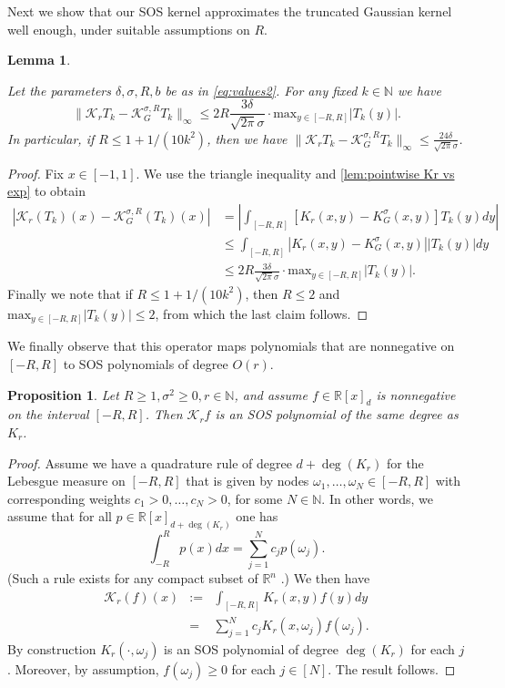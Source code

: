 \documentclass[11pt]{article}
\newcommand{\N}{\mathbb{N}}
\newcommand{\R}{\mathbb{R}}
\renewcommand{\max}{\mathrm{max}}
\newtheorem{proposition}[defin]{Proposition}
\newtheorem{lemma}[defin]{Lemma}
\theoremstyle{definition}
\newcommand{\const}[1]{1/(10 #1^2)}
\begin{document}
Next we show that our SOS kernel approximates the truncated Gaussian kernel well enough, under suitable assumptions on $R$.

\begin{lemma}
\label{lemma:truncation_error}

Let the parameters $\delta,\sigma, R, b$ be as in \cref{eq:values2}. For any fixed $k \in \N$ we have
\[
\|\mathcal K_r T_k - \mathcal K_G^{\sigma,R} T_k \|_\infty \leq 2R\frac{3\delta}{\sqrt{2\pi}\sigma} \cdot \max_{y \in [-R,R]} |T_k(y)|.
\]
In particular, if $R \leq 1 + \const{k}$, then we have $\|\mathcal K_r T_k - \mathcal K_G^{\sigma,R} T_k \|_\infty \leq \frac{24\delta}{\sqrt{2\pi}\sigma}$.
\end{lemma}
\begin{proof}

Fix $x \in [-1,1]$. We use the triangle inequality and \cref{lem:pointwise Kr vs exp} to obtain
\begin{align*}
|\mathcal K_r (T_k)(x) - \mathcal K_G^{\sigma,R}(T_k)(x) | &= \left|\int_{[-R,R]} [K_r(x,y) -K_G^\sigma(x,y)]T_k(y)dy\right| \\
&\leq \int_{[-R,R]} \left|K_r(x,y) -K_G^\sigma(x,y)\right|
\left|T_k(y)\right| dy \\
&\leq 2R\frac{3\delta}{\sqrt{2\pi}\sigma} \cdot \max_{y \in [-R,R]} |T_k(y)|.
\end{align*}
Finally we note that if $R \leq 1 + \const{k}$, then $R \leq 2$ and $\max_{y \in [-R,R]} |T_k(y)| \leq 2$, from which the last claim follows.
\end{proof}





We finally observe that this operator maps polynomials that are nonnegative on $[-R,R]$ to SOS polynomials of degree $O(r)$.

\begin{proposition} \label{prop:Kr is SOS}
Let $R \geq 1, \sigma^2 \geq 0, r \in \N$, and assume $f \in \R[x]_d$ is nonnegative on the interval $[-R,R]$. Then $\mathcal{K}_r f$ is an SOS polynomial of the same degree as $K_r$.
\end{proposition}
\begin{proof}
    Assume we have a quadrature rule of degree {$d + \deg(K_r)$}  for the Lebesgue measure on $[-R,R]$ that is given by nodes $\omega_1,\ldots,\omega_N \in [-R,R]$ with corresponding weights $c_1>0, \ldots, c_N >0$, for some $N \in \N$.
   {In other words, we assume that for all $p \in \R[x]_{d + \deg(K_r)}$ one has
\[
\int_{-R}^R p(x)dx = \sum_{j=1}^N c_jp(\omega_j).
\]}
(Such a rule exists for any compact subset of $\R^n$ \cite{Tchakaloff}.)
    We then have
    \begin{eqnarray*}
        \mathcal{K}_r (f)(x) &:=& \int_{[-R,R]} K_r(x,y)f(y)dy \\
        &=& \sum_{j=1}^N c_jK_r(x,\omega_j)f(\omega_j).
    \end{eqnarray*}
    By construction $K_r(\cdot,\omega_j)$ is an SOS polynomial of degree $\deg(K_r)$ for each $j$. Moreover, by assumption, $f(\omega_j) \geq 0$ for each $j \in [N]$. The result follows.
\end{proof}
\end{document}
